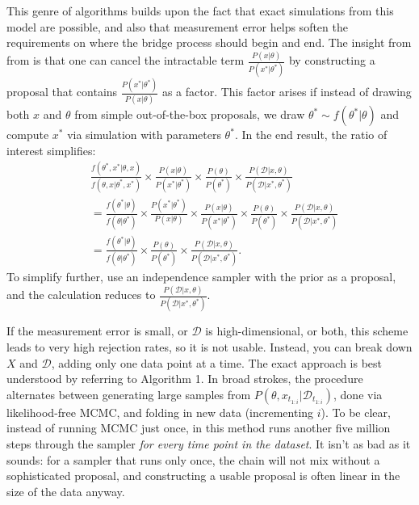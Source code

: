 \documentclass{article}
\begin{document}
This genre of algorithms builds upon the fact that exact simulations from this model are possible, and also that measurement error helps soften the requirements on where the bridge process should begin and end. %
The insight from from \cite{Marjoram23122003} is that one can cancel the intractable term $ \frac{P(x| \theta)}{P(x^*| \theta^*)}$ by constructing a proposal that contains  $\frac{P(x^*| \theta^*)}{P(x| \theta)}$ as a factor. This factor arises if instead of drawing both $x$ and $\theta$ from simple out-of-the-box proposals, we draw $\theta^*\sim f(\theta^*|\theta)$ and compute $x^*$ via simulation with parameters $\theta^*$. In the end result, the ratio of interest simplifies:
\begin{align*}
&\frac{f(\theta^*, x^*|\theta, x)}{f(\theta, x|\theta^*, x^*)}\times \frac{P(x| \theta)}{P(x^*| \theta^*)}\times \frac{ P( \theta)}{ P( \theta^*)}  \times \frac{P(\mathcal{D}|x, \theta)}{P(\mathcal{D}|x^*, \theta^*)}\\
&=\frac{f(\theta^*|\theta)}{f(\theta|\theta^*)}\times \frac{P(x^*| \theta^*)}{P(x| \theta)} \times \frac{P(x| \theta)}{P(x^*| \theta^*)} \times \frac{ P( \theta)}{ P( \theta^*)}\times \frac{P(\mathcal{D}|x, \theta)}{P(\mathcal{D}|x^*, \theta^*)}\\
&=\frac{f(\theta^*|\theta)}{f(\theta|\theta^*)}\times \frac{ P( \theta)}{ P( \theta^*)}\times \frac{P(\mathcal{D}|x, \theta)}{P(\mathcal{D}|x^*, \theta^*)}.
\end{align*}
To simplify further, use an independence sampler with the prior as a proposal, and the calculation reduces to $ \frac{P(\mathcal{D}|x, \theta)}{P(\mathcal{D}|x^*, \theta^*)}.$

If the measurement error is small, or $\mathcal{D}$ is high-dimensional, or both, this scheme leads to very high rejection rates, so it is not usable. Instead, you can break down $X$ and $\mathcal{D}$, adding only one data point at a time. The exact approach is best understood by referring to Algorithm 1. In broad strokes, the procedure alternates between generating large samples from $P(\theta, x_{t_{1:i}}|\mathcal{D}_{t_{1:i}})$, done via  likelihood-free MCMC, and folding in new data (incrementing $i$). To be clear, instead of running MCMC just once, in this method runs another five million steps through the sampler {\it for every time point in the dataset}. It isn't as bad as it sounds: for a sampler that runs only once, the chain will not mix without a sophisticated proposal, and constructing a usable proposal is often linear in the size of the data anyway. %
 
\end{document}
